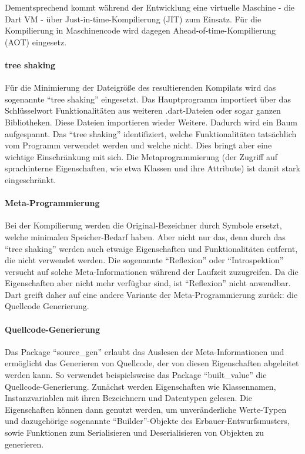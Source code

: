 Dementsprechend kommt während der Entwicklung eine virtuelle Maschine - die Dart VM - über Just-in-time-Kompilierung (JIT) zum Einsatz. Für die Kompilierung in Maschinencode wird dagegen Ahead-of-time-Kompilierung (AOT) eingesetz.

\paragraph{tree shaking}
Für die Minimierung der Dateigröße des resultierenden Kompilats wird das sogenannte \enquote{tree shaking} eingesetzt. Das Hauptprogramm importiert über das Schlüsselwort  Funktionalitäten aus  weiteren .dart-Dateien oder sogar ganzen Bibliotheken. Diese Dateien importieren wieder Weitere. Dadurch wird ein Baum aufgespannt. Das \enquote{tree shaking} identifiziert, welche Funktionalitäten tatsächlich vom Programm verwendet werden und welche nicht. Dies bringt aber eine wichtige Einschränkung mit sich. Die Metaprogrammierung (der Zugriff auf sprachinterne Eigenschaften, wie etwa Klassen und ihre Attribute) ist damit stark eingeschränkt.

\paragraph{Meta-Programmierung}
Bei der Kompilierung werden die Original-Bezeichner durch Symbole ersetzt, welche minimalen Speicher-Bedarf haben. Aber nicht nur das, denn durch das \enquote{tree shaking} werden auch etwaige Eigenschaften und Funktionalitäten entfernt, die nicht verwendet werden. Die sogenannte \enquote{Reflexion} oder \enquote{Introspektion} versucht auf solche Meta-Informationen während der Laufzeit zuzugreifen. Da die Eigenschaften aber nicht mehr verfügbar sind, ist \enquote{Reflexion} nicht anwendbar. Dart greift daher auf eine andere Variante der Meta-Programmierung zurück: die Quellcode Generierung.

\paragraph{Quellcode-Generierung}
Das Package \enquote{source_gen} erlaubt das Auslesen der Meta-Informationen und ermöglicht das Generieren von Quellcode, der von diesen Eigenschaften abgeleitet werden kann. So verwendet beispielsweise das Package \enquote{built_value} die Quellcode-Generierung. Zunächst werden Eigenschaften wie Klassennamen, Instanzvariablen mit ihren Bezeichnern und Datentypen gelesen. Die Eigenschaften können dann genutzt werden, um unveränderliche Werte-Typen und dazugehörige sogenannte \enquote{Builder}-Objekte des Erbauer-Entwurfsmusters, sowie Funktionen zum Serialisieren und Deserialisieren von Objekten zu generieren. 

